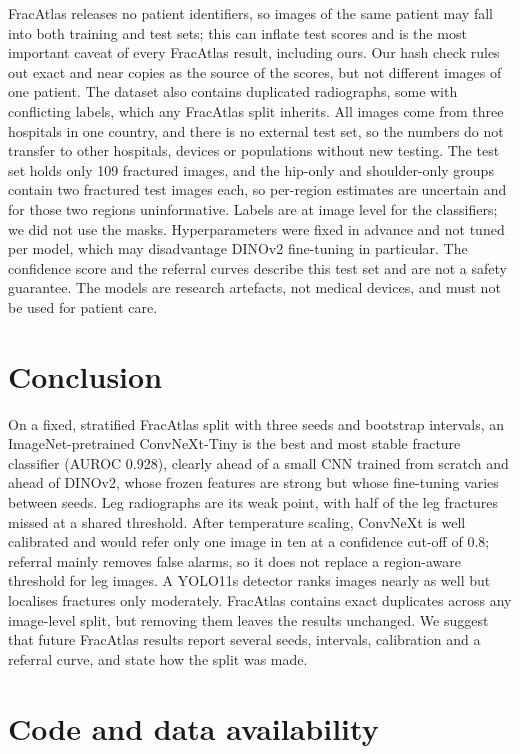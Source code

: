 \documentclass[11pt,a4paper]{article}
\begin{document}
FracAtlas releases no patient identifiers, so images of the same patient may fall into both training and test sets;
this can inflate test scores and is the most important caveat of every FracAtlas result, including ours. Our
hash check rules out exact and near copies as the source of the scores, but not different images of one patient.
The dataset also contains duplicated radiographs, some with conflicting labels, which any FracAtlas split inherits. All images
come from three hospitals in one country, and there is no external test set, so the numbers do not transfer to other
hospitals, devices or populations without new testing. The test set holds only 109 fractured images, and the hip-only
and shoulder-only groups contain two fractured test images each, so per-region estimates are uncertain and for those
two regions uninformative. Labels are at image level for the
classifiers; we did not use the masks. Hyperparameters were fixed in advance and not tuned per model, which may
disadvantage DINOv2 fine-tuning in particular. The confidence score and the referral curves describe this test set
and are not a safety guarantee. The models are research artefacts, not medical devices, and must not be used for
patient care.

\section{Conclusion}

On a fixed, stratified FracAtlas split with three seeds and bootstrap intervals, an ImageNet-pretrained ConvNeXt-Tiny
is the best and most stable fracture classifier (AUROC 0.928), clearly ahead of a small CNN trained from scratch and
ahead of DINOv2, whose frozen features are strong but whose fine-tuning varies between seeds. Leg radiographs are
its weak point, with half of the leg fractures missed at a shared threshold. After temperature scaling, ConvNeXt is
well calibrated and would refer only one image in ten at a confidence cut-off of 0.8; referral mainly removes false
alarms, so it does not replace a region-aware threshold for leg images. A YOLO11s
detector ranks images nearly as well but localises fractures only moderately. FracAtlas contains exact duplicates
across any image-level split, but removing them leaves the results unchanged. We suggest that future FracAtlas results
report several seeds, intervals, calibration and a referral curve, and state how the split was made.

\section*{Code and data availability}
\end{document}
